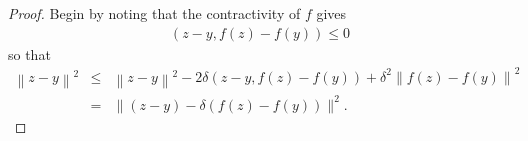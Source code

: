 \documentclass[10pt,a4paper]{amsart}
\begin{document}
\begin{proof}
Begin by noting that the contractivity of $f$ gives
\begin{eqnarray*}
    \left(z - y, f(z) -  f(y) \right) \leq 0 
\end{eqnarray*}  
so that
\begin{eqnarray*} 
\left\|z - y \right\|^2
& \leq &
\left\|z - y \right\|^2  
- 2 \delta   \left(z - y, f(z) -  f(y) \right)  + 
\delta^2 \left\|f(z) - f(y) \right\|^2 \\
& = & \| (z - y)  - \delta \left( f(z) - f(y)\right) \|^2.
\end{eqnarray*}

\end{proof}
\end{document}
